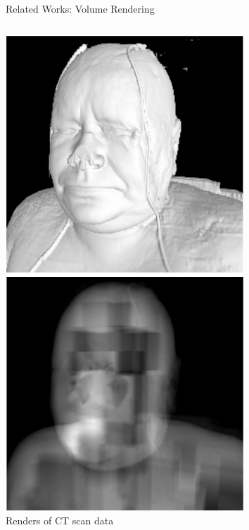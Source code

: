 \documentclass[10pt,handout,compress,professionalfont]{beamer}
\begin{document}
\begin{frame}{Related Works: Volume Rendering}
\begin{columns}
\begin{column}{0.3\textwidth}
            \includegraphics[width=\textwidth]{../img/external/vol_multi_res}\\
            {\centering\scriptsize Renders of CT scan data\\}
        \end{column}
    \end{columns}

\end{frame}
\end{document}
